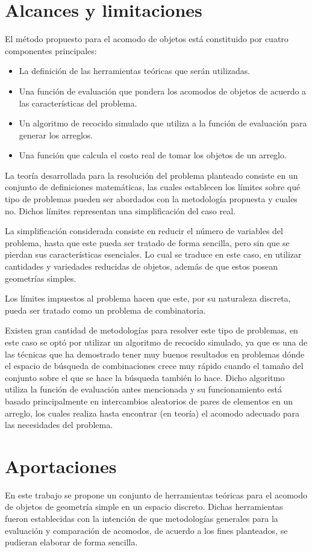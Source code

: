 \section{Alcances y limitaciones}
%
%
El método propuesto para el acomodo de objetos está constituido por cuatro componentes principales:
%
\begin{itemize}
	\item La definición de las herramientas teóricas que serán utilizadas.
	\item Una función de evaluación que pondera los acomodos de objetos de acuerdo a las características del problema. 
	\item Un algoritmo de recocido simulado que utiliza a la función de evaluación para generar los arreglos.
	\item Una función que calcula el costo real de tomar los objetos de un arreglo.
\end{itemize}
%
La teoría desarrollada para la resolución del problema planteado consiste en un conjunto de definiciones matemáticas, las cuales establecen los límites sobre qué tipo de problemas pueden ser abordados con la metodología propuesta y cuales no.
Dichos límites representan una simplificación del caso real.

La simplificación considerada consiste en reducir el número de variables del problema, hasta que este pueda ser tratado de forma sencilla, pero sin que se pierdan sus características esenciales.
Lo cual se traduce en este caso, en utilizar cantidades y variedades reducidas de objetos, además de que estos posean geometrías simples.

Los límites impuestos al problema hacen que este, por su naturaleza discreta, pueda ser tratado como un problema de combinatoria.

Existen gran cantidad de metodologías para resolver este tipo de problemas, en este caso se optó por utilizar un algoritmo de recocido simulado, ya que es una de las técnicas que ha demostrado tener muy buenos resultados en problemas dónde el espacio de búsqueda de combinaciones crece muy rápido cuando el tamaño del conjunto sobre el que se hace la búsqueda también lo hace.
Dicho algoritmo utiliza la función de evaluación antes mencionada y su funcionamiento está basado principalmente en intercambios aleatorios de pares de elementos en un arreglo, los cuales realiza hasta encontrar (en teoría) el acomodo adecuado para las necesidades del problema.
%
%
\section{Aportaciones}
%
%
En este trabajo se propone un conjunto de herramientas teóricas para el acomodo de objetos de geometría simple en un espacio discreto.
Dichas herramientas fueron establecidas con la intención de que metodologías generales para la evaluación y comparación de acomodos, de acuerdo a los fines planteados, se pudieran elaborar de forma sencilla.

